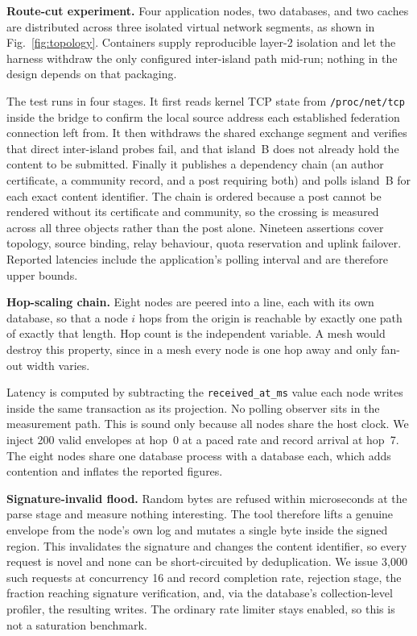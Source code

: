 \documentclass[conference,a4paper]{IEEEtran}
\begin{document}
\textbf{Route-cut experiment.} Four application nodes, two databases, and two
caches are distributed across three isolated virtual network segments, as
shown in Fig.~\ref{fig:topology}. Containers supply reproducible layer-2
isolation and let the harness withdraw the only configured inter-island path
mid-run; nothing in the design depends on that packaging.

The test runs in four stages. It first reads kernel TCP state from \texttt{/proc/net/tcp} inside the bridge to confirm the local source address each established federation connection left from. It then withdraws the shared exchange segment and verifies that direct inter-island probes fail, and that island~B does not already hold the content to be submitted. Finally it publishes a dependency chain (an author certificate, a community record, and a post requiring both) and polls island~B for each exact content identifier. The chain is ordered because a post cannot be rendered without its certificate and community, so the crossing is measured across all three objects rather than the post alone. Nineteen assertions cover topology, source binding, relay behaviour, quota reservation and uplink failover. Reported latencies include the application's polling interval and are therefore upper bounds.

\textbf{Hop-scaling chain.} Eight nodes are peered into a line, each with its
own database, so that a node $i$ hops from the origin is reachable by exactly
one path of exactly that length. Hop count is the independent variable. A mesh
would destroy this property, since in a mesh every node is one hop away and
only fan-out width varies.

Latency is computed by subtracting the \texttt{received\_at\_ms} value each
node writes inside the same transaction as its projection. No polling observer
sits in the measurement path. This is sound only because all nodes share the host clock. We inject 200 valid envelopes at hop~0 at a paced rate and record arrival at hop~7. The eight nodes share one database process with a database each, which adds contention and inflates the reported figures.

\textbf{Signature-invalid flood.} Random bytes are refused within microseconds
at the parse stage and measure nothing interesting. The tool therefore lifts a
genuine envelope from the node's own log and mutates a single byte inside the
signed region. This invalidates the signature and changes the content
identifier, so every request is novel and none can be short-circuited by
deduplication. We issue 3,000 such requests at concurrency 16 and record
completion rate, rejection stage, the fraction reaching signature
verification, and, via the database's collection-level profiler, the resulting writes. The ordinary rate limiter stays enabled, so this is not a
saturation benchmark.
\end{document}
